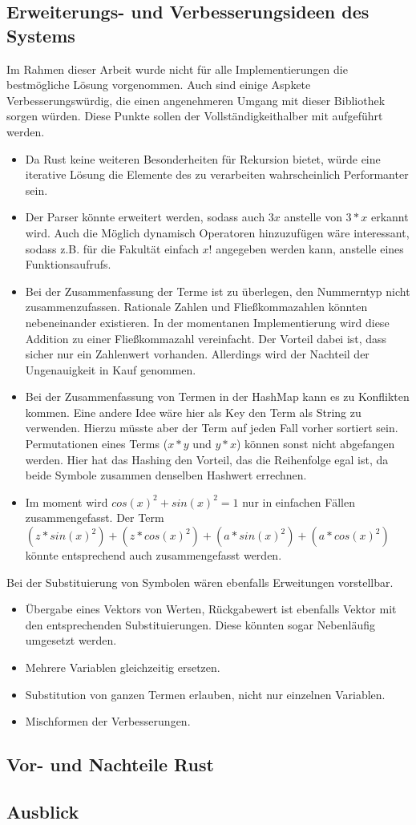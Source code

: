 \documentclass[11pt,a4paper, ngerman]{article}
\begin{document}
\subsection{Erweiterungs- und Verbesserungsideen des Systems}
Im Rahmen dieser Arbeit wurde nicht für alle Implementierungen die bestmögliche Lösung vorgenommen. Auch sind einige Aspkete Verbesserungswürdig, die einen angenehmeren Umgang mit dieser Bibliothek sorgen würden. Diese Punkte sollen der Vollständigkeithalber mit aufgeführt werden.
\begin{itemize}
    \item Da Rust keine weiteren Besonderheiten für Rekursion bietet, würde eine iterative Lösung die Elemente des  zu verarbeiten wahrscheinlich Performanter sein.
    \item Der Parser könnte erweitert werden, sodass auch $3x$ anstelle von $3*x$ erkannt wird. Auch die Möglich dynamisch Operatoren hinzuzufügen wäre interessant, sodass z.B. für die Fakultät einfach $x!$ angegeben werden kann, anstelle eines Funktionsaufrufs.
    \item Bei der Zusammenfassung der Terme ist zu überlegen, den Nummerntyp nicht zusammenzufassen. Rationale Zahlen und Fließkommazahlen könnten nebeneinander existieren. In der momentanen Implementierung wird diese Addition zu einer Fließkommazahl vereinfacht. Der Vorteil dabei ist, dass sicher nur ein Zahlenwert vorhanden. Allerdings wird der Nachteil der Ungenauigkeit in Kauf genommen.
    \item Bei der Zusammenfassung von Termen in der HashMap kann es zu Konflikten kommen. Eine andere Idee wäre hier als Key den Term als String zu verwenden. Hierzu müsste aber der Term auf jeden Fall vorher sortiert sein. Permutationen eines Terms ($x*y$ und $y*x$) können sonst nicht abgefangen werden. Hier hat das Hashing den Vorteil, das die Reihenfolge egal ist, da beide Symbole zusammen denselben Hashwert errechnen.
    \item Im moment wird $cos(x)^2+sin(x)^2 = 1$ nur in einfachen Fällen zusammengefasst. Der Term $(z*sin(x)^2)+(z*cos(x)^2) + (a*sin(x)^2)+(a*cos(x)^2)$ könnte entsprechend auch zusammengefasst werden.
\end{itemize}

Bei der Substituierung von Symbolen wären ebenfalls Erweitungen vorstellbar.
\begin{itemize}
    \item Übergabe eines Vektors von Werten, Rückgabewert ist ebenfalls Vektor mit den entsprechenden Substituierungen. Diese könnten sogar Nebenläufig umgesetzt werden.
    \item Mehrere Variablen gleichzeitig ersetzen.
    \item Substitution von ganzen Termen erlauben, nicht nur einzelnen Variablen.
    \item Mischformen der Verbesserungen.
\end{itemize}
\subsection{Vor- und Nachteile Rust}
\subsection{Ausblick}


\newpage

\raggedright

\end{document}
